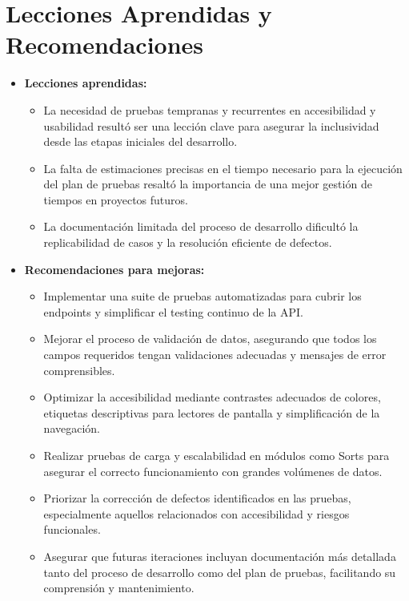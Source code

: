 \documentclass[stu, 12pt, letterpaper, donotrepeattitle, floatsintext, natbib]{apa7}
\begin{document}
\section{Lecciones Aprendidas y Recomendaciones}

\begin{itemize}
    \item \textbf{Lecciones aprendidas:}
    \begin{itemize}
        \item La necesidad de pruebas tempranas y recurrentes en accesibilidad y usabilidad result\'o ser una lecci\'on clave para asegurar la inclusividad desde las etapas iniciales del desarrollo.
        \item La falta de estimaciones precisas en el tiempo necesario para la ejecuci\'on del plan de pruebas resalt\'o la importancia de una mejor gesti\'on de tiempos en proyectos futuros.
        \item La documentaci\'on limitada del proceso de desarrollo dificult\'o la replicabilidad de casos y la resoluci\'on eficiente de defectos.
    \end{itemize}

    \item \textbf{Recomendaciones para mejoras:}
    \begin{itemize}
        \item Implementar una suite de pruebas automatizadas para cubrir los endpoints y simplificar el testing continuo de la API.
        \item Mejorar el proceso de validaci\'on de datos, asegurando que todos los campos requeridos tengan validaciones adecuadas y mensajes de error comprensibles.
        \item Optimizar la accesibilidad mediante contrastes adecuados de colores, etiquetas descriptivas para lectores de pantalla y simplificaci\'on de la navegaci\'on.
        \item Realizar pruebas de carga y escalabilidad en m\'odulos como Sorts para asegurar el correcto funcionamiento con grandes vol\'umenes de datos.
        \item Priorizar la correcci\'on de defectos identificados en las pruebas, especialmente aquellos relacionados con accesibilidad y riesgos funcionales.
        \item Asegurar que futuras iteraciones incluyan documentaci\'on m\'as detallada tanto del proceso de desarrollo como del plan de pruebas, facilitando su comprensi\'on y mantenimiento.
    \end{itemize}
\end{itemize}
\end{document}
